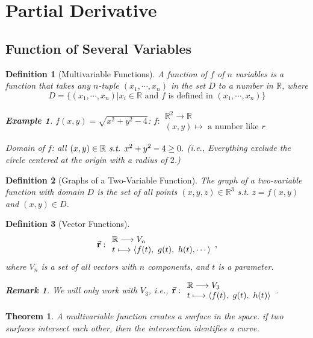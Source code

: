 \documentclass[12pt,a4paper]{article}
\newtheorem{thm}{Theorem}[subsection]
\newtheorem{df}{Definition}[subsection]
\newtheorem{eg}{Example}[subsection]
\newtheorem*{rmk}{\indent Remark}
\def\R{{\mathbb{R}}}
\def\vecr{\va{{\textbf{r}}}}
\begin{document}
\newpage
\section{Partial Derivative}
\subsection{Function of Several Variables}
\begin{df}[Multivariable Functions]
	A function of $f$ of $n$ variables is a function that takes any $n$-tuple $(x_1,\cdots,x_n)$ in the set $D$ to a number in $\R$, where \[D=\bigg\{(x_1,\cdots,x_n)|x_i\in\R\text{ and }f\text{ is defined in }(x_1,\cdots,x_n)\bigg\}\]	
	\begin{eg}
		$f(x,y)=\sqrt{x^2+y^2-4}$: $f:\begin{array}{l}\R^2\longrightarrow\R\\ (x,y)\longmapsto\text{ a number like }r\end{array}$	
		
		Domain of $f$: all $(x,y)\in\R\emph{ s.t. }x^2+y^2-4\geq0.$ (i.e., Everything exclude the circle centered at the origin with a radius of $2$.)
	\end{eg}
\end{df}
\begin{df}[Graphs of a Two-Variable Function]
	The graph of a two-variable function with domain $D$ is the set of all points $(x,y,z)\in\R^3$ \emph{s.t.} $z=f(x,y)$ and $(x,y)\in D$.	
\end{df}
\begin{df}[Vector Functions]
	\[\vecr:\begin{array}{l}\R\longrightarrow V_n\\ t\longmapsto\langle f(t),\ g(t),\ h(t),\cdots\rangle\end{array}, \] where $V_n$ is a set of all vectors with $n$ components, and $t$ is a parameter. 
	\begin{rmk}
		We will only work with $V_3$, i.e., 	$\vecr:\begin{array}{l}\R\longrightarrow V_3\\ t\longmapsto\langle f(t),\ g(t),\ h(t)\rangle\end{array}$.
	\end{rmk}
\end{df}
\begin{thm}
	A multivariable function creates a surface in the space. if two surfaces intersect each other, then the intersection identifies a curve.	
\end{thm}
\end{document}
